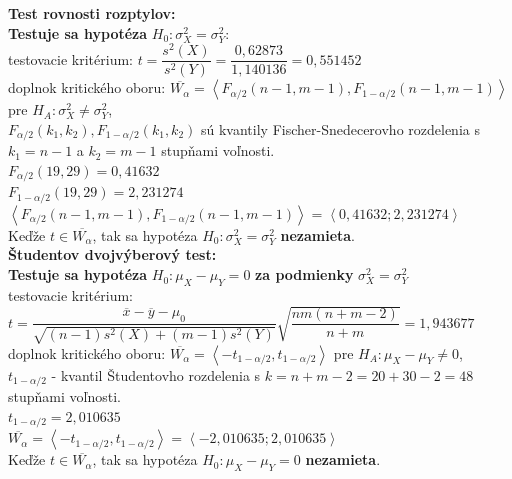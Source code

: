 \documentclass[pdftex, 11pt, a4paper, titlepage]{article}
\begin{document}
    \newpage
    \noindent
    \textbf{Test rovnosti rozptylov:}\\
    \textbf{Testuje sa hypotéza} $H_0 : \sigma_X^2 = \sigma_Y^2$:\\

    \noindent
    testovacie kritérium: $t = \dfrac{s^2(X)}{s^2(Y)} = \dfrac{0,62873}{1,140136} = 0,551452$\\
    doplnok kritického oboru: $\overline{W_\alpha} = \left\langle F_{\alpha/2}(n-1,m-1), F_{1-\alpha/2}(n-1,m-1) \right\rangle$ pre $H_A : \sigma_X^2 \neq \sigma_Y^2$,\\
    $F_{\alpha/2}(k_1,k_2), F_{1-\alpha/2}(k_1,k_2)$ sú kvantily Fischer-Snedecerovho rozdelenia s $k_1 = n-1$ a $k_2 = m-1$ stupňami voľnosti.\\
    $F_{\alpha/2}(19,29) = 0,41632$\\
    $F_{1-\alpha/2}(19,29) = 2,231274$\\
    $\left\langle F_{\alpha/2}(n-1,m-1), F_{1-\alpha/2}(n-1,m-1) \right\rangle = \left\langle 0,41632 ; 2,231274 \right\rangle$\\
    Keďže $t \in \overline{W_\alpha}$, tak sa hypotéza $H_0 : \sigma_X^2 = \sigma_Y^2$ \textbf{nezamieta}.\\

    \noindent
    \textbf{Študentov dvojvýberový test:}\\
    \textbf{Testuje sa hypotéza} $H_0 : \mu_X - \mu_Y = 0$ \textbf{za podmienky} $\sigma_X^2 = \sigma_Y^2$\\

    \noindent
    testovacie kritérium: $t = \dfrac{\overline{x}-\overline{y}-\mu_0}{\sqrt{(n-1)s^2(X)+(m-1)s^2(Y)}}\sqrt{\dfrac{nm(n+m-2)}{n+m}} = 1,943677$\\
    doplnok kritického oboru: $\overline{W_\alpha} = \left\langle -t_{1-\alpha/2}, t_{1-\alpha/2} \right\rangle$ pre $H_A : \mu_X - \mu_Y \neq 0$,\\
    $t_{1-\alpha/2}$ - kvantil Študentovho rozdelenia s $k=n+m-2=20+30-2=48$ stupňami voľnosti.\\
    $t_{1-\alpha/2} = 2,010635$\\
    $\overline{W_\alpha} = \left\langle -t_{1-\alpha/2}, t_{1-\alpha/2} \right\rangle = \left\langle -2,010635 ; 2,010635 \right\rangle$\\
    Keďže $t \in \overline{W_\alpha}$, tak sa hypotéza $H_0 : \mu_X - \mu_Y = 0$ \textbf{nezamieta}.
\end{document}
